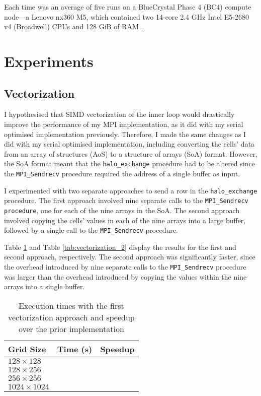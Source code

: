 \documentclass[twocolumn, a4paper]{article}
\begin{document}
Each time was an average of five runs on a BlueCrystal Phase 4 (BC4) compute node---a Lenovo nx360 M5, which contained two 14-core 2.4 GHz Intel E5-2680 v4 (Broadwell) CPUs and 128 GiB of RAM \cite{bcp4}.

\section{Experiments}

\subsection{Vectorization}

I hypothesised that SIMD vectorization of the inner loop would drastically improve the performance of my MPI implementation, as it did with my serial optimised implementation previously.
Therefore, I made the same changes as I did with my serial optimised implementation, including converting the cells' data from an array of structures (AoS) to a structure of arrays (SoA) format.
However, the SoA format meant that the \texttt{halo\_exchange} procedure had to be altered since the \texttt{MPI\_Sendrecv} procedure required the address of a single buffer as input.

I experimented with two separate approaches to send a row in the \texttt{halo\_exchange} procedure.
The first approach involved nine separate calls to the \texttt{MPI\_Sendrecv procedure}, one for each of the nine arrays in the SoA.
The second approach involved copying the cells' values in each of the nine arrays into a large buffer, followed by a single call to the \texttt{MPI\_Sendrecv} procedure.

Table \ref{tab:vectorization_1} and Table \ref{tab:vectorization_2} display the results for the first and second approach, respectively.
The second approach was significantly faster, since the overhead introduced by nine separate calls to the \texttt{MPI\_Sendrecv} procedure was larger than the overhead introduced by copying the values within the nine arrays into a single buffer.

\begin{table}[htbp]
  \begin{center}
  \caption{Execution times with the first vectorization approach and speedup over the prior implementation}\label{tab:vectorization_1}
  \begin{tabular}[t]{l | l l} 
      \hline\hline
      Grid Size&Time (s)&Speedup\\
      \hline
      $128 \times 128$&\texttt{}&\texttt{}\\
      $128 \times 256$&\texttt{}&\texttt{}\\
      $256 \times 256$&\texttt{}&\texttt{}\\
      $1024 \times 1024$&\texttt{}&\texttt{}\\
      \hline
    \end{tabular}
  \end{center}
\end{table}
\end{document}

